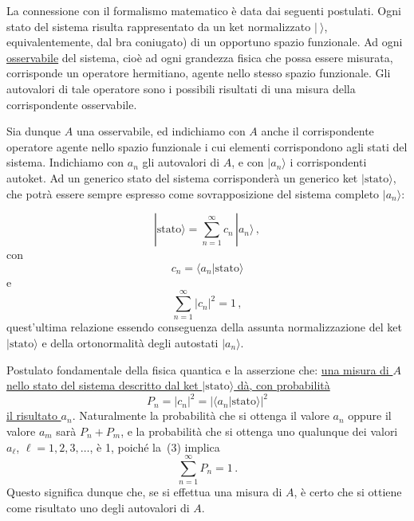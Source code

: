 \documentclass[11pt, a4paper]{book}
\numberwithin{equation}{section}
\begin{document}
La connessione con il formalismo matematico è data dai seguenti postulati. Ogni stato del sistema risulta rappresentato da un ket normalizzato $|\ \rangle$, equivalentemente, dal bra coniugato) di un opportuno spazio funzionale. Ad ogni \uline{osservabile} del sistema, cioè ad ogni grandezza fisica che possa essere misurata, corrisponde un operatore hermitiano, agente nello stesso spazio funzionale. Gli autovalori di tale operatore sono i possibili risultati di una misura della corrispondente osservabile.

Sia dunque $A$ una osservabile, ed indichiamo con $A$ anche il corrispondente operatore agente nello spazio funzionale i cui elementi corrispondono agli stati del sistema. Indichiamo con $a_n$ gli autovalori di $A$, e con $|a_n\rangle$ i corrispondenti autoket. Ad un generico stato del sistema corrisponderà un generico ket $|\text{stato}\rangle$, che potrà essere sempre espresso come sovrapposizione del sistema completo $|a_n\rangle$: %

\begin{equation}
|\text{stato}\rangle = \sum_{n=1}^{\infty} c_n\,|a_n\rangle\,,
\end{equation}
con
\begin{equation}
c_n = \langle a_n|\text{stato}\rangle
\end{equation}
e
\begin{equation}
\sum_{n=1}^{\infty}|c_n|^2 = 1\,,
\end{equation}
quest'ultima relazione essendo conseguenza della assunta normalizzazione del ket $|\text{stato}\rangle$ e della ortonormalità degli autostati $|a_n\rangle$.

Postulato fondamentale della fisica quantica e la asserzione che: \uline{una misura di $A$ nello stato del sistema descritto dal ket $|\text{stato}\rangle$ dà, con probabilità}
\begin{equation}
P_n = |c_n|^2 = |\langle a_n|\text{stato}\rangle|^2
\end{equation}
\uline{il risultato $a_n$}. Naturalmente la probabilità che si ottenga il valore $a_n$ oppure il valore $a_m$ sarà $P_n+P_m$, e la probabilità che si ottenga uno qualunque dei valori $a_\ell$, $\ell=1,2,3,\ldots$, è 1, poiché la~(3) implica
\begin{equation}
\sum_{n=1}^{\infty}P_n = 1\,.
\end{equation}
Questo significa dunque che, se si effettua una misura di $A$, è certo che si ottiene come risultato uno degli autovalori di $A$.
\end{document}
